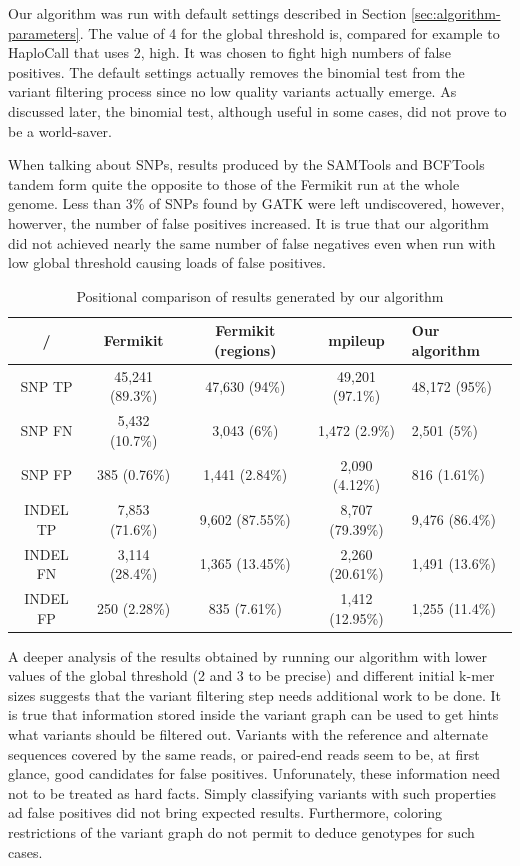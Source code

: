 Our algorithm was run with default settings described in Section \ref{sec:algorithm-parameters}. The value of 4 for the global threshold is, compared for example to HaploCall that uses 2, high. It was chosen to fight high numbers of false positives. The default settings actually removes the binomial test from the variant filtering process since no low quality variants actually emerge. As discussed later, the binomial test, although useful in some cases, did not prove to be a world-saver.

When talking about SNPs, results produced by the SAMTools and BCFTools tandem form quite the opposite to those of the Fermikit run at the whole genome. Less than 3\% of SNPs found by GATK were left undiscovered, however, howerver, the number of false positives increased. It is true that our algorithm did not achieved nearly the same number of false negatives even when run with low global threshold causing loads of false positives.

\begin{table}
\begin{center}
\caption{Positional comparison of results generated by our algorithm}
\label{tab:positional-results}
\begin{tabular}{| c | c | c | c | p{3cm} |}
\hline
/ & Fermikit & Fermikit (regions) & mpileup & Our algorithm \\
\hline
SNP TP & 45,241 (89.3\%) & 47,630 (94\%) & 49,201 (97.1\%) & 48,172 (95\%) \\
\hline
SNP FN & 5,432 (10.7\%) & 3,043 (6\%) & 1,472 (2.9\%) & 2,501 (5\%) \\
\hline
SNP FP & 385 (0.76\%) & 1,441 (2.84\%) & 2,090 (4.12\%) & 816 (1.61\%) \\
\hline
INDEL TP & 7,853 (71.6\%) & 9,602 (87.55\%) & 8,707 (79.39\%) & 9,476 (86.4\%) \\
\hline
INDEL FN & 3,114 (28.4\%) & 1,365 (13.45\%) & 2,260 (20.61\%) & 1,491 (13.6\%) \\
\hline
INDEL FP & 250 (2.28\%) & 835 (7.61\%) & 1,412 (12.95\%) & 1,255 (11.4\%) \\
\hline
\end{tabular}
\end{center}
\end{table}

A deeper analysis of the results obtained by running our algorithm with lower values of the global threshold (2 and 3 to be precise) and different initial k-mer sizes suggests that the variant filtering step needs additional work to be done. It is true that information stored inside the variant graph can be used to get hints what variants should be filtered out. Variants with the reference and alternate sequences covered by the same reads, or paired-end reads seem to be, at first glance, good candidates for false positives. Unforunately, these information need not to be treated as hard facts. Simply classifying variants with such properties ad false positives did not bring expected results. Furthermore, coloring restrictions of the variant graph do not permit to deduce genotypes for such cases.

